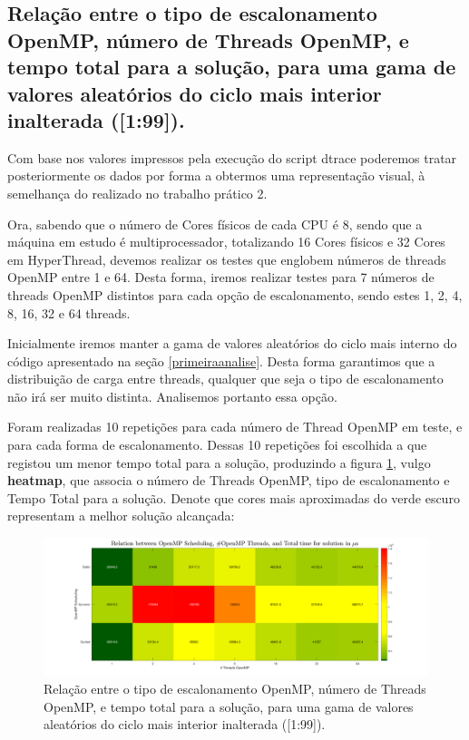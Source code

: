 \documentclass[a4paper]{article}
\begin{document}
\subsection{Relação entre o tipo de escalonamento OpenMP, número de Threads OpenMP, e tempo total para a solução, para uma gama de valores aleatórios do ciclo mais interior inalterada ([1:99]).}
\label{tempos_exe3_gama_inalterada}
Com base nos valores impressos pela execução do script dtrace poderemos tratar posteriormente os dados por forma a obtermos uma representação visual, à semelhança do realizado no trabalho prático 2.\par 
Ora, sabendo que o número de Cores físicos de cada CPU é 8, sendo que a máquina em estudo é multiprocessador, totalizando 16 Cores físicos e 32 Cores em HyperThread, devemos realizar os testes que englobem números de threads OpenMP entre 1 e 64. Desta forma, iremos realizar testes para 7 números de threads OpenMP distintos para cada opção de escalonamento, sendo estes 1, 2, 4, 8, 16, 32 e 64 threads.\par 
Inicialmente iremos manter a gama de valores aleatórios do ciclo mais interno do código apresentado na seção \ref{primeiraanalise}. Desta forma garantimos que a distribuição de carga entre threads, qualquer que seja o tipo de escalonamento não irá ser muito distinta. Analisemos portanto essa opção.\par 
Foram realizadas 10 repetições para cada número de Thread OpenMP em teste, e para cada forma de escalonamento. Dessas 10 repetições foi escolhida a que registou um menor tempo total para a solução, produzindo a figura \ref{fig:heatmap_scheduling_openmp}, vulgo \textbf{heatmap}, que associa o número de Threads OpenMP, tipo de escalonamento e Tempo Total para a solução. Denote que cores mais aproximadas do verde escuro representam a melhor solução alcançada:
\begin{figure}[H]
\centering
\includegraphics[width=1\columnwidth]{PNG/heatmap_scheduling_openmp.png}
\caption{ Relação entre o tipo de escalonamento OpenMP, número de Threads OpenMP, e tempo total para a solução, para uma gama de valores aleatórios do ciclo mais interior inalterada ([1:99]). }
\label{fig:heatmap_scheduling_openmp}
\end{figure}
\end{document}
